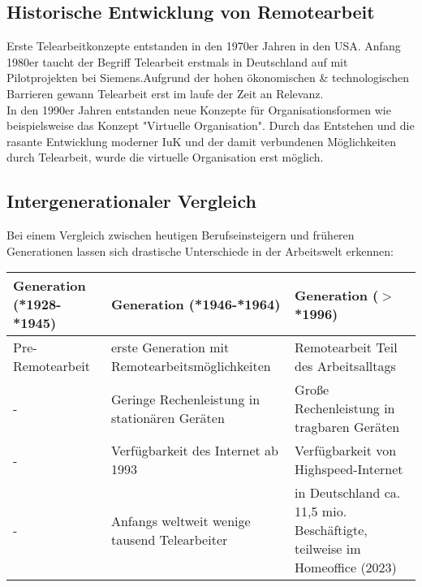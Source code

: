 \documentclass[runningheads]{llncs}
\begin{document}
\subsection{Historische Entwicklung von Remotearbeit}
Erste Telearbeitkonzepte entstanden in den 1970er Jahren in den USA\cite{Dangelmaier.1999}. Anfang 1980er taucht der Begriff Telearbeit erstmals in Deutschland auf mit Pilot\-projekten bei Siemens\cite{Dangelmaier.1999}.Aufgrund der hohen ökonomischen \& technologischen Barrieren gewann Telearbeit erst im laufe der Zeit an Relevanz\cite{Dangelmaier.1999}.\\
In den 1990er Jahren entstanden neue Konzepte für Organisationsformen wie beispielsweise das Konzept "Virtuelle Organisation"\cite{Siedenbiedel.2020}. Durch das Entstehen und die rasante Entwicklung moderner IuK und der damit verbundenen Möglichkeiten durch Telearbeit, wurde die virtuelle Organisation erst möglich\cite{Siedenbiedel.2020}.

\subsection{Intergenerationaler Vergleich}
Bei einem Vergleich zwischen heutigen Berufseinsteigern und früheren Generationen lassen sich drastische Unterschiede in der Arbeitswelt erkennen:
\vspace{-\baselineskip}
\begin{center}
\begin{tabular}{ | m{13em} | m{13em}| m{13em} | } 
\hline
Generation (*1928-*1945) & Generation (*1946-*1964) & Generation ($>$*1996) \\
\hline
Pre-Remotearbeit & erste Generation mit Remotearbeitsmöglichkeiten & Remotearbeit Teil des Arbeits\-alltags\\
\hline
- & Geringe Rechenleistung in stationären Geräten & Große Rechenleistung in tragbaren Geräten\\
\hline
- & Verfügbarkeit des Internet ab 1993\cite{CERN} & Verfügbarkeit von Highspeed-Internet\\
\hline
- & Anfangs weltweit wenige tausend Telearbeiter\cite{heilmann1983softwareentwicklung} & in Deutschland ca. 11,5 mio. Beschäftigte, teilweise im Homeoffice (2023)\cite{statis24, ifo23}\\
\hline
\end{tabular}
\end{center}

\end{document}
